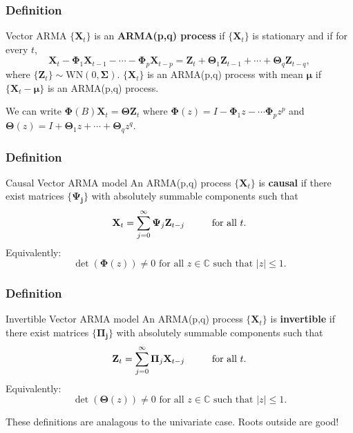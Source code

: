 \documentclass{beamer}
\begin{document}

\begin{frame}
\frametitle{Definition}

\begin{block}{Vector ARMA}
$\{\mathbf{X}_t\}$ is an {\bf ARMA(p,q) process} if $\{\mathbf{X}_t\}$ is stationary and if for every $t$,
\[
\mathbf{X}_t - \bm{\Phi}_1 \mathbf{X}_{t-1} - \cdots - \bm{\Phi}_p \mathbf{X}_{t-p} = \mathbf{Z}_{t} + \bm{\Theta}_1\mathbf{Z}_{t-1} + \cdots + \bm{\Theta}_q\mathbf{Z}_{t-q},
\]
where $\{\bm{Z}_t\} \sim \text{WN}(0, \bm{\Sigma})$. $\{\mathbf{X}_t\}$ is an ARMA(p,q) process with mean $\bm{\mu}$ if $\{\mathbf{X}_t-\bm{\mu}\}$ is an ARMA(p,q) process.
\end{block}

We can write $\bm{\Phi}(B) \mathbf{X}_t = \bm{\Theta} \mathbf{Z}_t$ where $\bm{\Phi}(z) = I - \bm{\Phi}_1 z - \cdots \bm{\Phi}_pz^p$ and $\bm{\Theta}(z) = I + \bm{\Theta}_1 z  + \cdots + \bm{\Theta}_q z^q$.
\end{frame}



\begin{frame}
\frametitle{Definition}

\begin{block}{Causal Vector ARMA model}
An ARMA(p,q) process $\{\mathbf{X}_t\}$ is {\bf causal} if there exist matrices $\{\bm{\Psi_j}\}$ with absolutely summable components such that 
\[
\mathbf{X}_t = \sum_{j=0}^{\infty} \bm{\Psi}_j \mathbf{Z}_{t-j} \hspace{10mm} \text{for all } t.
\]
Equivalently:
\[
\det(\bm{\Phi}(z)) \neq 0 \text{ for all } z \in \mathbb{C} \text{ such that } |z| \le 1.
\]
\end{block}


\end{frame}


\begin{frame}
\frametitle{Definition}

\begin{block}{Invertible Vector ARMA model}
An ARMA(p,q) process $\{\mathbf{X}_t\}$ is {\bf invertible} if there exist matrices $\{\bm{\Pi_j}\}$ with absolutely summable components such that 
\[
\mathbf{Z}_t = \sum_{j=0}^{\infty} \bm{\Pi}_j \mathbf{X}_{t-j} \hspace{10mm} \text{for all } t.
\]
Equivalently:
\[
\det(\bm{\Theta}(z)) \neq 0 \text{ for all } z \in \mathbb{C} \text{ such that } |z| \le 1.
\]
\end{block}
\pause

These definitions are analagous to the univariate case. Roots outside are good!


\end{frame}
\end{document}

